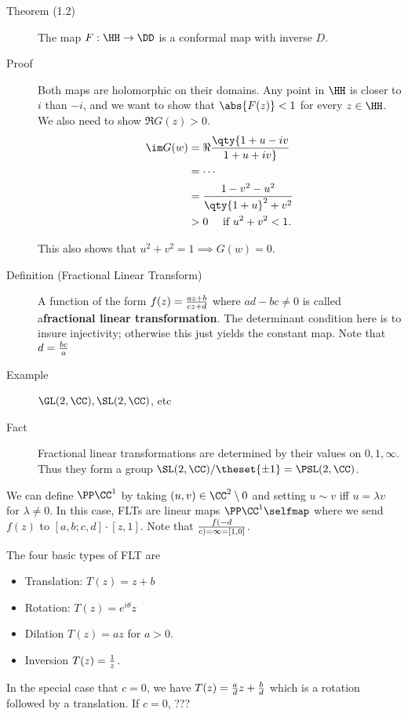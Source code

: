 \begin{description}
\item[Theorem (1.2)]
The map \(F: \HH \to \DD\) is a conformal map with inverse \(D\).
\item[Proof]
Both maps are holomorphic on their domains. Any point in \(\HH\) is
closer to \(i\) than \(-i\), and we want to show that \(\abs{F(z)} < 1\)
for every \(z\in \HH\). We also need to show \(\Re G(z) > 0\).
\begin{align*}
\im G(w)
&= \Re\qty{ 1 + u -iv \over 1 + u + iv } \\
&= \cdots \\
&= {1 - v^2 - u^2 \over \qty{1+u}^2 + v^2} \\
&> 0 \quad \text{ if } u^2 + v^2 < 1
.\end{align*}

This also shows that \(u^2 +v^2 = 1 \implies G(w) = 0\).
\item[Definition (Fractional Linear Transform)]
A function of the form \(f(z) = {az + b \over cz + d}\) where
\(ad-bc\neq 0\) is called a\textbf{fractional linear transformation}.
The determinant condition here is to insure injectivity; otherwise this
just yields the constant map. Note that \(d = {bc \over a}\)
\item[Example]
\(\GL(2, \CC), \SL(2, \CC)\), etc
\item[Fact]
Fractional linear transformations are determined by their values on
\(0, 1, \infty\). Thus they form a group
\(\SL(2, \CC) / \theset{\pm 1} = \PSL(2, \CC)\).
\end{description}

We can define \(\PP\CC^1\) by taking \((u, v) \in \CC^2\setminus 0\) and
setting \(u\sim v\) iff \(u = \lambda v\) for \(\lambda \neq 0\). In
this case, FLTs are linear maps \(\PP\CC^1 \selfmap\) where we send
\(f(z)\) to \([a, b; c, d] \cdot [z, 1]\). Note that
\(f(-d \over c) = \infty = [1, 0]\).

The four basic types of FLT are

\begin{itemize}
\tightlist
\item
  Translation: \(T(z) = z+b\)
\item
  Rotation: \(T(z) = e^{i\theta} z\)
\item
  Dilation \(T(z) = az\) for \(a> 0\).
\item
  Inversion \(T(z) = {1 \over z}\).
\end{itemize}

In the special case that \(c=0\), we have
\(T(z) = {a \over d}z + {b\over d}\) which is a rotation followed by a
translation. If \(c=0\), ???

